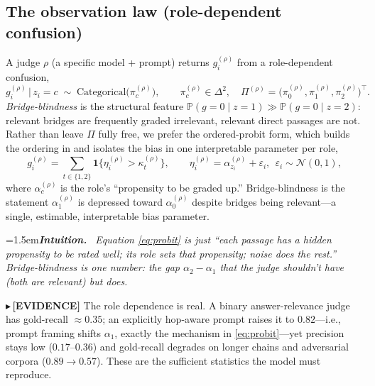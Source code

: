 \documentclass[11pt]{article}
\newcommand{\TESTED}[1]{{\color{teal}\small$\blacktriangleright$\,\textbf{[EVIDENCE]} #1}}
\newenvironment{intuition}{\par\smallskip\noindent\hangindent=1.5em\textbf{\itshape Intuition.}\itshape\ \ignorespaces}{\par\smallskip}
\newcommand{\N}{\mathcal{N}}
\renewcommand{\Pr}{\mathbb{P}}
\begin{document}
\subsection{The observation law (role-dependent confusion)}
A judge $\rho$ (a specific model + prompt) returns $g_i^{(\rho)}$ from a role-dependent confusion,
\begin{equation}\label{eq:obs}
  g_i^{(\rho)}\,\big|\,z_i=c \;\sim\; \mathrm{Categorical}\!\big(\pi^{(\rho)}_c\big),\qquad
  \pi^{(\rho)}_c\in\Delta^2,\quad \Pi^{(\rho)}=\big(\pi^{(\rho)}_0,\pi^{(\rho)}_1,\pi^{(\rho)}_2\big)^\top .
\end{equation}
\emph{Bridge-blindness} is the structural feature $\Pr(g{=}0\mid z{=}1)\gg\Pr(g{=}0\mid z{=}2)$: relevant
bridges are frequently graded irrelevant, relevant direct passages are not. Rather than leave $\Pi$ fully free,
we prefer the ordered-probit form, which builds the ordering in and isolates the bias in one interpretable
parameter per role,
\begin{equation}\label{eq:probit}
  g_i^{(\rho)}=\sum_{t\in\{1,2\}}\mathbf 1\{\eta_i^{(\rho)}>\kappa_t^{(\rho)}\},\qquad
  \eta_i^{(\rho)}=\alpha^{(\rho)}_{z_i}+\varepsilon_i,\ \ \varepsilon_i\sim\N(0,1),
\end{equation}
where $\alpha^{(\rho)}_c$ is the role's ``propensity to be graded up.'' Bridge-blindness is the statement
$\alpha^{(\rho)}_1$ is depressed toward $\alpha^{(\rho)}_0$ despite bridges being relevant---a single,
estimable, interpretable bias parameter.
\begin{intuition}
Equation \eqref{eq:probit} is just ``each passage has a hidden propensity to be rated well; its role sets that
propensity; noise does the rest.'' Bridge-blindness is one number: the gap $\alpha_2-\alpha_1$ that the judge
\emph{shouldn't} have (both are relevant) but does.
\end{intuition}
\TESTED{The role dependence is real. A binary answer-relevance judge has gold-recall $\approx0.35$; an
explicitly hop-aware prompt raises it to $0.82$---i.e., prompt framing shifts $\alpha_1$, exactly the mechanism
in \eqref{eq:probit}---yet precision stays low ($0.17$--$0.36$) and gold-recall degrades on longer chains and
adversarial corpora ($0.89\to0.57$). These are the sufficient statistics the model must reproduce.}
\end{document}
